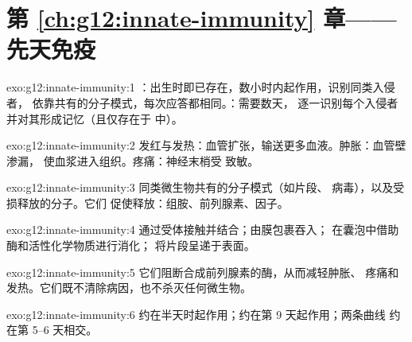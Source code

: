 \section*{第 \ref{ch:g12:innate-immunity} 章——先天免疫}

\begin{solution}{exo:g12:innate-immunity:1}
：出生时即已存在，数小时内起作用，识别同类入侵者，
依靠共有的分子模式，每次应答都相同。：需要数天，
逐一识别每个入侵者并对其形成记忆（且仅存在于
中）。
\end{solution}

\begin{solution}{exo:g12:innate-immunity:2}
发红与发热：血管扩张，输送更多血液。肿胀：血管壁渗漏，
使血浆进入组织。疼痛：神经末梢受
致敏。
\end{solution}

\begin{solution}{exo:g12:innate-immunity:3}
同类微生物共有的分子模式（如片段、
病毒），以及受损释放的分子。它们
促使释放：组胺、前列腺素、因子。
\end{solution}

\begin{solution}{exo:g12:innate-immunity:4}
通过受体接触并结合；由膜包裹吞入；
在囊泡中借助酶和活性化学物质进行消化；
将片段呈递于表面。
\end{solution}

\begin{solution}{exo:g12:innate-immunity:5}
它们阻断合成前列腺素的酶，从而减轻肿胀、
疼痛和发热。它们既不清除病因，也不杀灭任何微生物。
\end{solution}

\begin{solution}{exo:g12:innate-immunity:6}
约在半天时起作用；约在第 9 天起作用；两条曲线
约在第 5--6 天相交。
\end{solution}

